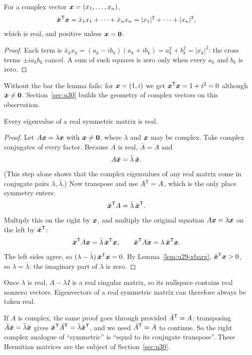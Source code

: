 \begin{lemma}\label{lem:u29-xbarx}
For a complex vector $\boldsymbol{x}=(x_1,\dots,x_n)$,
\[
  \bar{\boldsymbol{x}}^{\mathsf{T}}\boldsymbol{x}=\bar x_1x_1+\cdots+\bar x_nx_n=|x_1|^2+\cdots+|x_n|^2 ,
\]
which is real, and positive unless $\boldsymbol{x}=\boldsymbol{0}$.
\end{lemma}
\begin{proof}
Each term is $\bar x_kx_k=(a_k-ib_k)(a_k+ib_k)=a_k^2+b_k^2=|x_k|^2$: the cross terms $\pm ia_kb_k$
cancel. A sum of such squares is zero only when every $a_k$ and $b_k$ is zero.
\end{proof}

Without the bar the lemma fails: for $\boldsymbol{x}=(1,i)$ we get $\boldsymbol{x}^{\mathsf{T}}\boldsymbol{x}=1+i^2=0$ although
$\boldsymbol{x}\ne\boldsymbol{0}$. Section~\ref{sec:u30} builds the geometry of complex vectors on this
observation.

\begin{theorem}\label{thm:u29-real}
Every eigenvalue of a real symmetric matrix is real.
\end{theorem}
\begin{proof}
Let $A\boldsymbol{x}=\lambda\boldsymbol{x}$ with $\boldsymbol{x}\ne\boldsymbol{0}$, where $\lambda$ and $\boldsymbol{x}$ may be complex.
Take complex conjugates of every factor. Because $A$ is real, $\bar A=A$ and
\[
  A\bar{\boldsymbol{x}}=\bar\lambda\,\bar{\boldsymbol{x}}.
\]
(This step alone shows that the complex eigenvalues of any real matrix come in conjugate pairs
$\lambda,\bar\lambda$.) Now transpose and use $A^{\mathsf{T}}=A$, which is the only place symmetry enters:
\[
  \bar{\boldsymbol{x}}^{\mathsf{T}} A=\bar\lambda\,\bar{\boldsymbol{x}}^{\mathsf{T}} .
\]
Multiply this on the right by $\boldsymbol{x}$, and multiply the original equation $A\boldsymbol{x}=\lambda\boldsymbol{x}$
on the left by $\bar{\boldsymbol{x}}^{\mathsf{T}}$:
\[
  \bar{\boldsymbol{x}}^{\mathsf{T}} A\boldsymbol{x}=\bar\lambda\,\bar{\boldsymbol{x}}^{\mathsf{T}}\boldsymbol{x},
  \qquad
  \bar{\boldsymbol{x}}^{\mathsf{T}} A\boldsymbol{x}=\lambda\,\bar{\boldsymbol{x}}^{\mathsf{T}}\boldsymbol{x}.
\]
The left sides agree, so $(\lambda-\bar\lambda)\,\bar{\boldsymbol{x}}^{\mathsf{T}}\boldsymbol{x}=0$. By
Lemma~\ref{lem:u29-xbarx}, $\bar{\boldsymbol{x}}^{\mathsf{T}}\boldsymbol{x}>0$, so $\lambda=\bar\lambda$: the imaginary part
of $\lambda$ is zero.
\end{proof}

Once $\lambda$ is real, $A-\lambda I$ is a real singular matrix, so its nullspace contains real
nonzero vectors. Eigenvectors of a real symmetric matrix can therefore always be taken real.

\begin{remark}
If $A$ is complex, the same proof goes through provided $\bar A^{\mathsf{T}}=A$: transposing
$\bar A\bar{\boldsymbol{x}}=\bar\lambda\bar{\boldsymbol{x}}$ gives $\bar{\boldsymbol{x}}^{\mathsf{T}}\bar A^{\mathsf{T}}=\bar\lambda\bar{\boldsymbol{x}}^{\mathsf{T}}$,
and we need $\bar A^{\mathsf{T}}=A$ to continue. So the right complex analogue of ``symmetric'' is
``equal to its conjugate transpose''. These Hermitian matrices are the subject of
Section~\ref{sec:u30}.
\end{remark}

